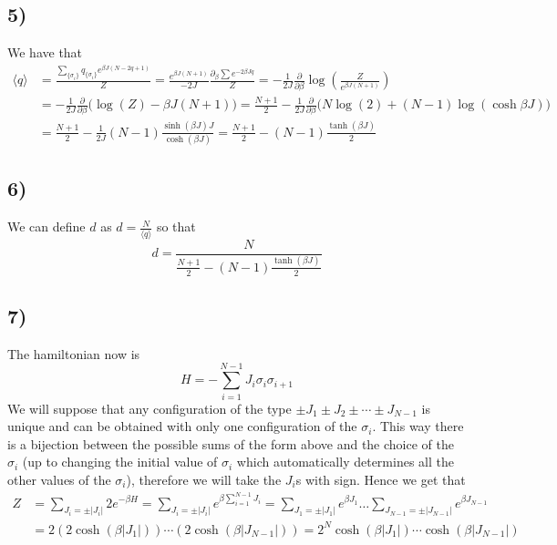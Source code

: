 \documentclass[10pt,a4paper]{book}
\newcommand{\p}{\partial}
\begin{document}
\subsection*{5)}

We have that
\begin{align*}
\langle q\rangle&=\frac{\sum_{\{\sigma_i\}}q_{\{\sigma_i\}}e^{\beta J(N-2q+1)}}{Z}=\frac{e^{\beta J(N+1)}}{-2J}\frac{\p_{\beta} \sum e^{-2\beta J q}}{Z}=-\frac{1}{2J}\frac{\p}{\p\beta}\log(\frac{Z}{e^{\beta J(N+1)}})\\
&=-\frac{1}{2J}\frac{\p}{\p\beta}\bigg(\log(Z)-\beta J(N+1)\bigg)=\frac{N+1}{2}-\frac{1}{2J}\frac{\p}{\p\beta}\bigg(N\log(2)+(N-1)\log(\cosh\beta J)\bigg)\\
&=\frac{N+1}{2}-\frac{1}{2J}(N-1)\frac{\sinh(\beta J)J}{\cosh(\beta J)}=\frac{N+1}{2}-(N-1)\frac{\tanh(\beta J)}{2}
\end{align*}

\subsection*{6)}
We can define $d$ as $d=\frac{N}{\langle q\rangle} $
so that 
$$d=\frac{N}{\frac{N+1}{2}-(N-1)\frac{\tanh(\beta J)}{2}}$$

\subsection*{7)}
The hamiltonian now is 
$$H=-\sum_{i=1}^{N-1}J_i\sigma_i\sigma_{i+1}$$
We will suppose that any configuration of the type $\pm J_1\pm J_2\pm\cdots\pm J_{N-1}$ is unique and can be obtained with only one configuration of the $\sigma_i$. This way there is a bijection between the possible sums of the form above and the choice of the $\sigma_i$ (up to changing the initial value of $\sigma_i$ which automatically determines all the other values of the $\sigma_i$), therefore we will take the $J_i$s with sign. Hence we get that
\begin{align*}
Z&=\sum_{J_i=\pm |J_i|} 2e^{-\beta H}=\sum_{J_i=\pm|J_i|}e^{\beta\sum_{i=1}^{N-1}J_i}=\sum_{J_1=\pm|J_1|}e^{\beta J_1}\ldots \sum_{J_{N-1}=\pm|J_{N-1}|}e^{\beta J_{N-1}}\\
&=2(2\cosh(\beta |J_1|))\cdots (2\cosh(\beta |J_{N-1}|))=2^{N}\cosh(\beta |J_1|)\cdots\cosh(\beta |J_{N-1}|)
\end{align*}
\end{document}
